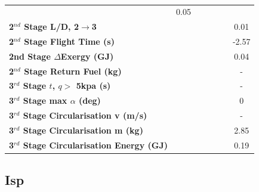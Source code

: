 \begin{table}[ht]
\begin{tabular}{l c c c c c c}
	&0.05
	\\
	\textbf{2$^{nd}$ Stage L/D, 2$\rightarrow$3}
	& \secondthirdSeparationLDqForty
	& \secondthirdSeparationLDqFortyFive
	& \secondthirdSeparationLDqStandard
	& \secondthirdSeparationLDqFiftyFive
	& \secondthirdSeparationLDqSixty
	&0.01
	\\
	\textbf{2$^{nd}$ Stage Flight Time (s)}
	& \secondFlightTimeqForty
	& \secondFlightTimeqFortyFive
	& \secondFlightTimeqStandard
	& \secondFlightTimeqFiftyFive
	& \secondFlightTimeqSixty
	&-2.57
	\\
	\textbf{2nd Stage $\Delta$Exergy (GJ)}
	& \seconddExergyqForty
	& \seconddExergyqFortyFive
	& \seconddExergyqStandard
	& \seconddExergyqFiftyFive
	& \seconddExergyqSixty
	&0.04
	\\
	\textbf{2$^{nd}$ Stage Return Fuel (kg)}
	& \returnFuelqForty
	& \returnFuelqFortyFive
	& \returnFuelqStandard
	& \returnFuelqFiftyFive
	& \returnFuelqSixty
	& -
	\\
	\textbf{3$^{rd}$ Stage $t$, $q >$ 5kpa (s)}
	& \thirdqOverFiveqForty
	& \thirdqOverFiveqFortyFive
	& \thirdqOverFiveqStandard
	& \thirdqOverFiveqFiftyFive
	& \thirdqOverFiveqSixty
	& -
	\\
	\textbf{3$^{rd}$ Stage max $\alpha$ (deg)}
	& \thirdmaxAoAqForty
	& \thirdmaxAoAqFortyFive
	& \thirdmaxAoAqStandard
	& \thirdmaxAoAqFiftyFive
	& \thirdmaxAoAqSixty
	&0
	\\
	\textbf{3$^{rd}$ Stage Circularisation v (m/s)}
	& \thirdcircvqForty
	& \thirdcircvqFortyFive
	& \thirdcircvqStandard
	& \thirdcircvqFiftyFive
	& \thirdcircvqSixty
	& -
	\\
	\textbf{3$^{rd}$ Stage Circularisation m (kg)}
	& \thirdcircmqForty
	& \thirdcircmqFortyFive
	& \thirdcircmqStandard
	& \thirdcircmqFiftyFive
	& \thirdcircmqSixty
	&2.85
	\\
	\textbf{3$^{rd}$ Stage Circularisation Energy (GJ)}
	& \thirdcircEnergyqForty
	& \thirdcircEnergyqFortyFive
	& \thirdcircEnergyqStandard
	& \thirdcircEnergyqFiftyFive
	& \thirdcircEnergyqSixty
	&0.19
	\\
	\hline 
\end{tabular} 
\caption{}
\label{tab:qvarreturn}
\end{table}


\subsection{Isp}

